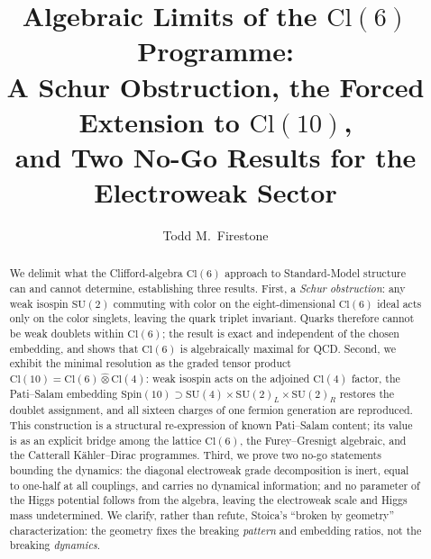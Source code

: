 \documentclass[12pt]{article}
\theoremstyle{remark}
\newcommand{\cl}{\mathrm{Cl}}
\newcommand{\spin}{\mathrm{Spin}}
\newcommand{\su}{\mathrm{SU}}
\newcommand{\grtensor}{\mathbin{\widehat{\otimes}}}  %
\begin{document}
\title{%
	\textbf{Algebraic Limits of the \texorpdfstring{$\cl(6)$}{Cl(6)}
		Programme:}\\[4pt]
	\textbf{A Schur Obstruction, the Forced Extension to
		\texorpdfstring{$\cl(10)$}{Cl(10)},}\\[4pt]
	\textbf{and Two No-Go Results for the Electroweak Sector}%
}
\author{Todd M.\ Firestone}
\date{}
\maketitle

\begin{abstract}
We delimit what the Clifford-algebra $\cl(6)$ approach to Standard-Model
structure can and cannot determine, establishing three results.  First, a
\emph{Schur obstruction}: any weak isospin $\su(2)$ commuting with color on the
eight-dimensional $\cl(6)$ ideal acts only on the color singlets, leaving the
quark triplet invariant.  Quarks therefore cannot be weak doublets within
$\cl(6)$; the result is exact and independent of the chosen embedding, and shows
that $\cl(6)$ is algebraically maximal for QCD.  Second, we exhibit the minimal
resolution as the graded tensor product
$\cl(10)=\cl(6)\grtensor\cl(4)$: weak isospin acts on the adjoined $\cl(4)$
factor, the Pati--Salam embedding
$\spin(10)\supset\su(4)\times\su(2)_L\times\su(2)_R$ restores the doublet
assignment, and all sixteen charges of one fermion generation are reproduced.
This construction is a structural re-expression of known Pati--Salam content;
its value is as an explicit bridge among the lattice $\cl(6)$, the
Furey--Gresnigt algebraic, and the Catterall K\"ahler--Dirac programmes.  Third,
we prove two no-go statements bounding the dynamics: the diagonal electroweak
grade decomposition is inert, equal to one-half at all couplings, and carries no
dynamical information; and no parameter of the Higgs potential follows from the
algebra, leaving the electroweak scale and Higgs mass undetermined.  We clarify,
rather than refute, Stoica's ``broken by geometry'' characterization: the
geometry fixes the breaking \emph{pattern} and embedding ratios, not the
breaking \emph{dynamics}.
\end{abstract}
\end{document}
